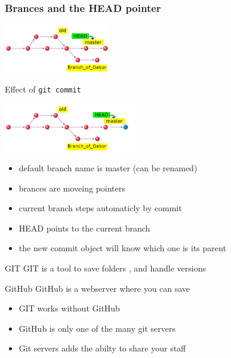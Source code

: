 \documentclass[aspectratio=169]{beamer}
\begin{document}
\begin{frame}
	\frametitle<presentation>{Brances and the HEAD pointer}

	\noindent\begin{minipage}{0.5\textwidth}
	
	\includegraphics[height=60pt]{pictures/git-head-1.png}
	
	Effect of \texttt{git commit}

	\includegraphics[height=60pt]{pictures/git-head+after-commit.png}

	\end{minipage}%
	\hfill%
	\begin{minipage}{0.45\textwidth}\raggedleft
		\begin{block}{}
		\begin{itemize}
		  \item default branch name is master (can be renamed)
		  \item brances are moveing pointers
		  \item current branch steps automaticly by commit
		  \item HEAD points to the current branch
		  \item the new commit object will know which one is its parent
		\end{itemize}
		\end{block}
	\end{minipage}
	
	
\end{frame}



\begin{frame}

\begin{block}{GIT}
GIT is a  tool to save folders , and handle versions
\end{block}


\begin{block}{GitHub}
GitHub is a webserver where you can save 
\end{block}



\begin{itemize}
\item GIT works without GitHub
\item GitHub is only one of the many git servers
\item Git servers adds the abilty to share your staff
\end{itemize}
 
\end{frame}
\end{document}
